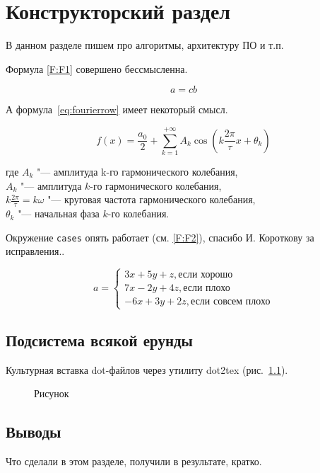 \chapter{Конструкторский раздел}
\label{cha:design}

В данном разделе пишем про алгоритмы, архитектуру ПО и т.п.

Формула \eqref{F:F1} совершено бессмысленна.

\begin{equation}
a= cb
\label{F:F1}
\end{equation}

А формула~\eqref{eq:fourierrow} имеет некоторый смысл.

\begin{eqndesc}
    \begin{equation}\label{eq:fourierrow}
        f(x) = \frac{a_0}{2} + \sum\limits_{k=1}^{+\infty} A_k\cos\left(k\frac{2\pi}{\tau}x+\theta_k\right)
    \end{equation}

    где $A_k$ "--- амплитуда  k-го гармонического колебания,\\
    $A_k$ "--- амплитуда $k$-го гармонического колебания,\\
    $ k\frac{2\pi}{\tau} = k\omega$ "--- круговая частота гармонического колебания,\\
    $\theta_k$ "--- начальная фаза $k$-го колебания.
\end{eqndesc}


Окружение \texttt{cases} опять работает (см. \eqref{F:F2}), спасибо И. Короткову за исправления..


\begin{equation}
a= \begin{cases}
 3x + 5y + z, \mbox{если хорошо} \\
 7x - 2y + 4z, \mbox{если плохо}\\
 -6x + 3y + 2z, \mbox{если совсем плохо}
\end{cases}
\label{F:F2}
\end{equation}

\section{Подсистема всякой ерунды}

Культурная вставка dot-файлов через утилиту dot2tex (рис.~\ref{fig:fig02}).

\begin{figure}
  \centering
  \caption{Рисунок}
  \label{fig:fig02}
\end{figure}


\section*{Выводы}

Что сделали в этом разделе, получили в результате, кратко.
